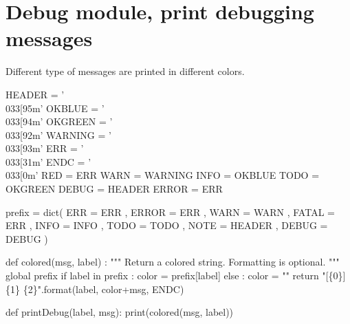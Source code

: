 \documentclass[]{article}%
\begin{document}
\section{Debug module, print debugging messages}
\label{sec:debug}

  Different type of messages are printed in different colors. 

\nwenddocs{}\endmoddef\nwstartdeflinemarkup\nwenddeflinemarkup
HEADER = '\\033[95m'
OKBLUE = '\\033[94m'
OKGREEN = '\\033[92m'
WARNING = '\\033[93m'
ERR = '\\033[31m'
ENDC = '\\033[0m'
RED = ERR
WARN = WARNING
INFO = OKBLUE
TODO = OKGREEN
DEBUG = HEADER
ERROR = ERR

prefix = dict(
    ERR = ERR
    , ERROR = ERR
    , WARN = WARN
    , FATAL = ERR
    , INFO = INFO
    , TODO = TODO 
    , NOTE = HEADER 
    , DEBUG = DEBUG
    )

def colored(msg, label) :
    """
    Return a colored string. Formatting is optional.
    """
    global prefix
    if label in prefix :
        color = prefix[label]
    else :
        color = ""
    return "[\{0\}] \{1\} \{2\}".format(label, color+msg, ENDC)

def printDebug(label, msg):
    print(colored(msg, label))

\eatline
{}\nwendcode{}
\end{document}
